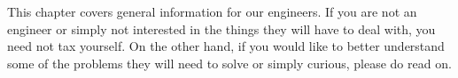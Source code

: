 

This chapter covers general information for our engineers. If you are not an engineer or simply not interested in the things they will have to deal with, you need not tax yourself. On the other hand, if you would like to better understand some of the problems they will need to solve or simply curious, please do read on.



%


\StopChapter

